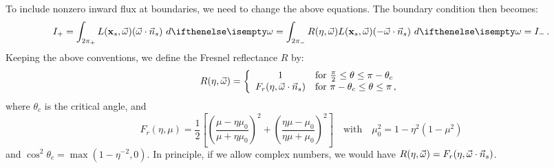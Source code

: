 \documentclass[10pt,a4paper]{article}
\begin{document}
To include nonzero inward flux at boundaries, we need to change the above equations. The boundary condition then becomes:
\begin{equation}
I_+ = \hemisphere{L(\mathbf{x}_s, \omegavec) (\omegavec \cdot \vec{n}_s)}{} = \lowerhemisphere{R(\eta, \omegavec) L(\mathbf{x}_s, \omegavec) (-\omegavec \cdot \vec{n}_s)}{} = I_- \, .
\label{eq:diffb}
\end{equation}
Keeping the above conventions, we define the Fresnel reflectance $R$ by:
$$
R(\eta, \omegavec) =
\left\{\begin{array}{c@{\quad}l}
1 & \text{for $\frac{\pi}{2} \leq \theta \leq \pi - \theta_c$}\\
F_r(\eta, \omegavec\cdot\vec{n}_s) & \text{for $\pi - \theta_c \leq \theta \leq \pi$} \, ,
\end{array} \right.
$$
where $\theta_c$ is the critical angle, and
$$
F_r(\eta, \mu) = \frac{1}{2}\left[\left(\frac{\mu - \eta\mu_0}{\mu + \eta\mu_0}\right)^{\!2} + \left(\frac{\eta\mu - \mu_0}{\eta\mu + \mu_0}\right)^{\!2}\right] \quad \text{with} \quad \mu_0^2 = 1 - \eta^2(1 - \mu^2)
$$
and $\cos^2\theta_c = \max(1 - \eta^{-2}, 0)$.
In principle, if we allow complex numbers, we would have $R(\eta, \vec{\omega}) = F_r(\eta, \vec{\omega}\cdot\vec{n}_s)$.
\end{document}
